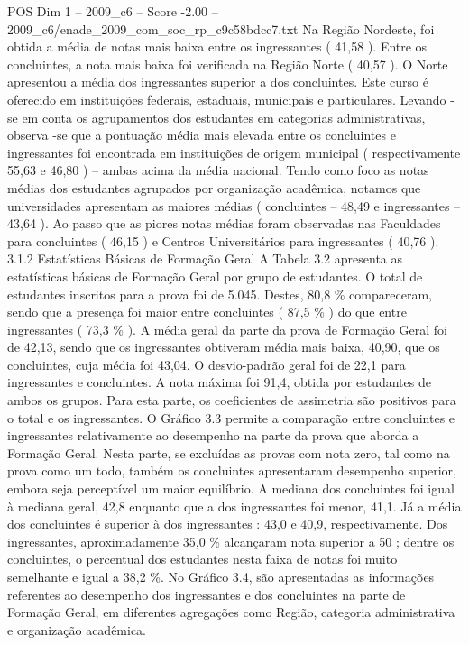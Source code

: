 \begin{textsample}{POS Dim 1 – 2009\_c6 – Score -2.00 – 2009\_c6/enade\_2009\_com\_soc\_rp\_c9c58bdcc7.txt}
Na Região Nordeste, foi obtida a média de notas mais baixa entre os ingressantes ( 41,58 ).
Entre os concluintes, a nota mais baixa foi verificada na Região Norte ( 40,57 ).
O Norte apresentou a média dos ingressantes superior a dos concluintes.
Este curso é oferecido em instituições federais, estaduais, municipais e particulares.
Levando -se em conta os agrupamentos dos estudantes em categorias administrativas, observa -se que a pontuação média mais elevada entre os concluintes e ingressantes foi encontrada em instituições de origem municipal ( respectivamente 55,63 e 46,80 ) – ambas acima da média nacional.
Tendo como foco as notas médias dos estudantes agrupados por organização acadêmica, notamos que universidades apresentam as maiores médias ( concluintes – 48,49 e ingressantes – 43,64 ).
Ao passo que as piores notas médias foram observadas nas Faculdades para concluintes ( 46,15 ) e Centros Universitários para ingressantes ( 40,76 ). 3.1.2 Estatísticas Básicas de Formação Geral A Tabela 3.2 apresenta as estatísticas básicas de Formação Geral por grupo de estudantes.
O total de estudantes inscritos para a prova foi de 5.045.
Destes, 80,8 \% compareceram, sendo que a presença foi maior entre concluintes ( 87,5 \% ) do que entre ingressantes ( 73,3 \% ).
A média geral da parte da prova de Formação Geral foi de 42,13, sendo que os ingressantes obtiveram média mais baixa, 40,90, que os concluintes, cuja média foi 43,04.
O desvio-padrão geral foi de 22,1 para ingressantes e concluintes.
A nota máxima foi 91,4, obtida por estudantes de ambos os grupos.
Para esta parte, os coeficientes de assimetria são positivos para o total e os ingressantes.
O Gráfico 3.3 permite a comparação entre concluintes e ingressantes relativamente ao desempenho na parte da prova que aborda a Formação Geral.
Nesta parte, se excluídas as provas com nota zero, tal como na prova como um todo, também os concluintes apresentaram desempenho superior, embora seja perceptível um maior equilíbrio.
A mediana dos concluintes foi igual à mediana geral, 42,8 enquanto que a dos ingressantes foi menor, 41,1.
Já a média dos concluintes é superior à dos ingressantes : 43,0 e 40,9, respectivamente.
Dos ingressantes, aproximadamente 35,0 \% alcançaram nota superior a 50 ; dentre os concluintes, o percentual dos estudantes nesta faixa de notas foi muito semelhante e igual a 38,2 \%.
No Gráfico 3.4, são apresentadas as informações referentes ao desempenho dos ingressantes e dos concluintes na parte de Formação Geral, em diferentes agregações como Região, categoria administrativa e organização acadêmica.

\end{textsample}
